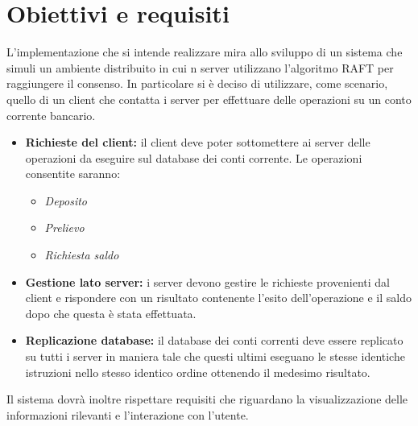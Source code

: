\section{Obiettivi e requisiti}
	L'implementazione che si intende realizzare mira allo sviluppo di un sistema che simuli un ambiente distribuito in cui n server utilizzano l'algoritmo RAFT per raggiungere il consenso. In particolare si è deciso di utilizzare, come scenario, quello di un client che contatta i server per effettuare delle operazioni su un conto corrente bancario.
	\begin{itemize}
			\item \textbf{Richieste del client:} il client deve poter sottomettere ai server delle operazioni da eseguire sul database dei conti corrente. Le operazioni consentite saranno:
				\begin{itemize}
					\item \emph{Deposito}
					\item \emph{Prelievo}
					\item \emph{Richiesta saldo}
				\end{itemize}
			\item \textbf{Gestione lato server:} i server devono gestire le richieste provenienti dal client e rispondere con un risultato contenente l'esito dell'operazione e il saldo dopo che questa è stata effettuata.
			\item \textbf{Replicazione database:} il database dei conti correnti deve essere replicato su tutti i server in maniera tale che questi ultimi eseguano le stesse identiche istruzioni nello stesso identico ordine ottenendo il medesimo risultato.
		\end{itemize}

	Il sistema dovrà inoltre rispettare requisiti che riguardano la visualizzazione delle informazioni rilevanti e l'interazione con l'utente.


